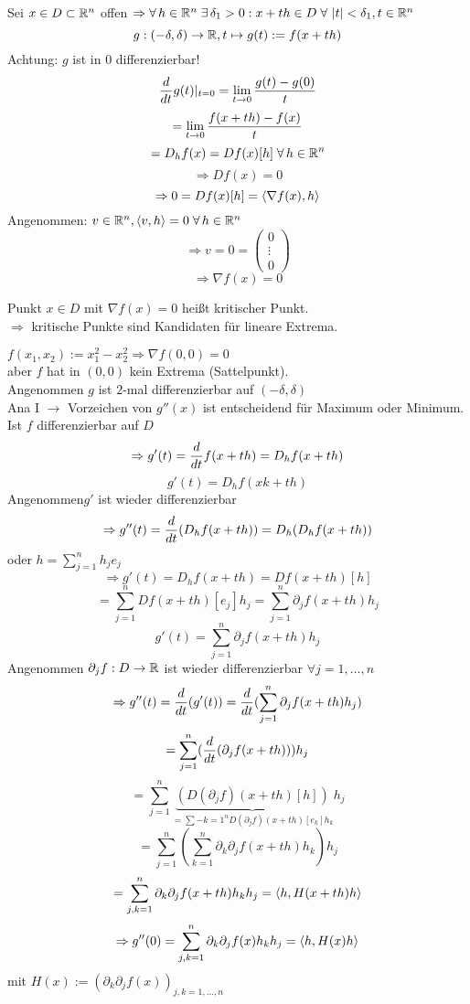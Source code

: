 \documentclass[../ana2.tex]{subfiles}
\begin{document}
\begin{bew}
    Sei \(x \in D \subset \mathbb{R}^n\) offen \(\Rightarrow \forall h \in \R^n \; 
    \exists \delta_1 > 0: x +th \in D \; \forall \abs{t} < \delta_1, t \in \R^n \) \\
    \[ g:(-\delta, \delta)\rightarrow \mathbb{R}, t \mapsto g(t):= f(x+th) \]
    Achtung: \(g\) ist in \(0\) differenzierbar!
    \[ \frac{d}{dt} g(t) \vert_{t=0} = \lim\limits_{t\rightarrow{}0} \frac{g(t)-g(0)}{t} \]
    \[ = \lim\limits_{t\rightarrow{}0} \frac{f(x+th)- f(x)}{t} \]
    \[ = D_hf(x) = Df(x)[h] \; \forall h \in \R^n \]
    \[ \Rightarrow Df(x) = 0 \]
    \[ \Rightarrow 0 = Df(x)[h] = \langle \nabla f(x), h \rangle \]
    Angenommen: \(v \in \R^n, \scalarprod{v}{h} = 0 \; \forall h \in \R^n\)
    \[ \Rightarrow v = 0 = \begin{pmatrix}
        0\\
        \vdots\\
        0
    \end{pmatrix} \]
    \[ \Rightarrow \nabla f(x) = 0 \]
\end{bew}
\begin{bem}
    Punkt \(x \in D\) mit \(\nabla f(x) = 0\) heißt kritischer Punkt.\\
    \( \Rightarrow \) kritische Punkte sind Kandidaten für lineare Extrema.
\end{bem}
\begin{bsp}
    \(f(x_1, x_2) := x_1^2 - x_2^2 \Rightarrow \nabla f(0, 0) = 0\)\\
    aber \(f\) hat in \((0,0)\) kein Extrema (Sattelpunkt).\\
    Angenommen \(g\) ist \(2\)-mal differenzierbar auf \((-\delta, \delta)\)\\
    Ana I \(\rightarrow\) Vorzeichen von \(g''(x)\) ist entscheidend für 
    Maximum oder Minimum.\\
    Ist \(f\) differenzierbar auf \(D\)
    \[ \Rightarrow g'(t) = \frac{d}{dt} f(x+th) = D_hf(x+th) \]
    \[ g'(t) = D_h f(xk+th) \]
    Angenommen\(g'\) ist wieder differenzierbar
    \[ \Rightarrow g''(t) = \frac{d}{dt} (D_hf(x+th)) = D_h(D_hf(x+th)) \]
    oder \( h = \sum_{j=1}^n h_j e_j \)
    \[ \Rightarrow g'(t) = D_hf(x+th) = Df(x+th)[h] \]
    \[ = \sum_{j=1}^n Df(x+th)[e_j]h_j = \sum_{j=1}^n \partial_j f(x+th)h_j \]
    \[ g'(t) = \sum_{j=1}^n \partial_j f(x+th) h_j \]
    Angenommen \( \partial_j f:D\rightarrow \mathbb{R} \) ist wieder differenzierbar \(\forall j=1, \ldots, n\)
    \[ \Rightarrow g''(t) = \frac{d}{dt} (g'(t)) = \frac{d}{dt} (\sum_{j=1}^n \partial_j f(x+th)h_j) \]
    \[ = \sum_{j=1}^n  (\frac{d}{dt}(\partial_j f(x+th)))h_j\]
    \[ = \sum_{j=1}^n 
    \underbrace{(D(\partial_j f)(x+th)[h])}_{= \sum-{k=1}^n D(\partial_jf)(x+th)[e_k]h_k} h_j \]
    \[ = \sum_{j=1}^n ( \sum_{k=1}^n \partial_k \partial_j f(x+th)h_k)h_j \]
    \[ = \sum_{j,k = 1}^n \partial_k \partial_j f(x+th)h_k h_j = \langle h, H(x+th)h \rangle \]
    \[ \Rightarrow g''(0) = \sum_{j,k = 1}^n \partial_k \partial_j f(x) h_k h_j 
    = \langle h, H(x)h \rangle \]
    mit \(H(x) := (\partial_k \partial_j f(x))_{j,k=1,\ldots,n} \) 
\end{bsp}
\end{document}
